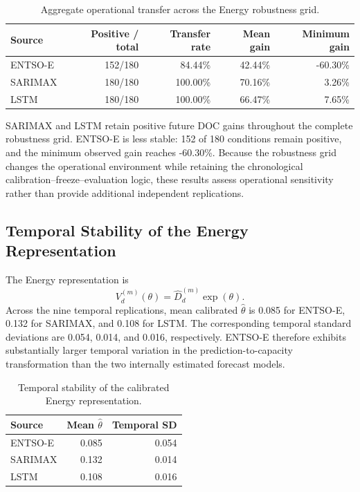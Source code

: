 \documentclass[a4paper,fleqn]{cas-sc}
\begin{document}
\begin{table}[!ht]
\centering
\caption{Aggregate operational transfer across the Energy robustness grid.}
\label{tab:supp_energy_transfer}
\begin{tabular}{lrrrr}
\toprule
Source & Positive / total & Transfer rate & Mean gain & Minimum gain \\
\midrule
ENTSO-E & 152/180 & 84.44\% & 42.44\% & -60.30\% \\
SARIMAX & 180/180 & 100.00\% & 70.16\% & 3.26\% \\
LSTM    & 180/180 & 100.00\% & 66.47\% & 7.65\% \\
\bottomrule
\end{tabular}
\end{table}

SARIMAX and LSTM retain positive future DOC gains throughout the complete
robustness grid. ENTSO-E is less stable: 152 of 180 conditions remain positive,
and the minimum observed gain reaches -60.30\%. Because the robustness grid
changes the operational environment while retaining the chronological
calibration--freeze--evaluation logic, these results assess operational
sensitivity rather than provide additional independent replications.

\subsection{Temporal Stability of the Energy Representation}
\label{sec:supp_energy_theta}

The Energy representation is
\[
V_d^{(m)}(\theta)=\widehat D_d^{(m)}\exp(\theta).
\]
Across the nine temporal replications, mean calibrated $\widehat{\theta}$ is
0.085 for ENTSO-E, 0.132 for SARIMAX, and 0.108 for LSTM. The corresponding
temporal standard deviations are 0.054, 0.014, and 0.016, respectively.
ENTSO-E therefore exhibits substantially larger temporal variation in the
prediction-to-capacity transformation than the two internally estimated
forecast models.

\begin{table}[!ht]
\centering
\caption{Temporal stability of the calibrated Energy representation.}
\label{tab:supp_theta}
\begin{tabular}{lrr}
\toprule
Source & Mean $\widehat{\theta}$ & Temporal SD \\
\midrule
ENTSO-E & 0.085 & 0.054 \\
SARIMAX & 0.132 & 0.014 \\
LSTM & 0.108 & 0.016 \\
\bottomrule
\end{tabular}
\end{table}
\end{document}
